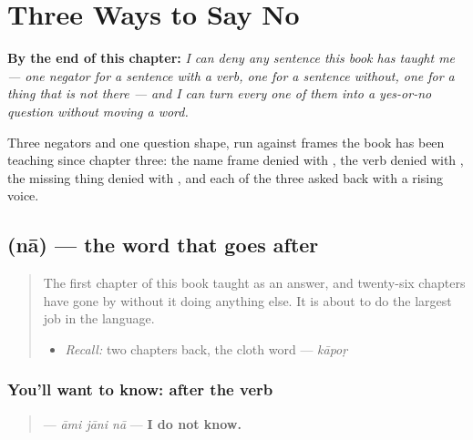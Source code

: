 
\chapter{Three Ways to Say No}
\label{ch:bn-three-ways-to-say-no}

\begin{chapteropening}
\textbf{By the end of this chapter:} \emph{I can deny any sentence this book has taught me — one negator for a sentence with a verb, one for a sentence without, one for a thing that is not there — and I can turn every one of them into a yes-or-no question without moving a word.}

Three negators and one question shape, run against frames the book has been teaching since chapter three: the name frame denied with , the verb denied with , the missing thing denied with , and each of the three asked back with a rising voice.
\end{chapteropening}

\section[\texorpdfstring{\bn{না} (nā)}{না (nā)}]{ (nā) — the word that goes after}

\label{lesson:BN-C16-na-verb}



\begin{quote}
The first chapter of this book taught \textbf{} as an answer, and twenty-six chapters have gone by without it doing anything else. It is about to do the largest job in the language.

\begin{itemize}
\raggedright
  \item \emph{Recall:} two chapters back, the cloth word — \emph{kāpoṛ}
\end{itemize}
\end{quote}

\subsection*{You'll want to know:  after the verb}
\begin{quote}
\textbf{  } — \emph{āmi jāni nā} — \textbf{I do not know.}
\end{quote}

